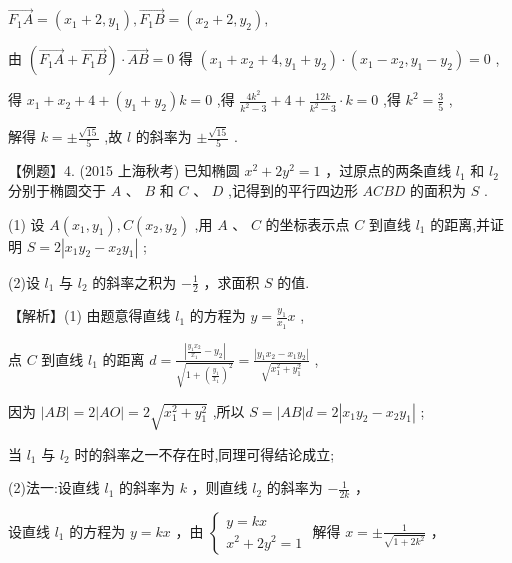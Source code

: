 \documentclass[10pt]{article}
\begin{document}
\(\overrightarrow{{F}_{1}A} = \left( {{x}_{1} + 2,{y}_{1}}\right) ,\overrightarrow{{F}_{1}B} = \left( {{x}_{2} + 2,{y}_{2}}\right) ,\)

由 \(\left( {\overrightarrow{{F}_{1}A} + \overrightarrow{{F}_{1}B}}\right)  \cdot  \overrightarrow{AB} = 0\) 得 \(\left( {{x}_{1} + {x}_{2} + 4,{y}_{1} + {y}_{2}}\right)  \cdot  \left( {{x}_{1} - {x}_{2},{y}_{1} - {y}_{2}}\right)  = 0\) ,

得 \({x}_{1} + {x}_{2} + 4 + \left( {{y}_{1} + {y}_{2}}\right) k = 0\) ,得 \(\frac{4{k}^{2}}{{k}^{2} - 3} + 4 + \frac{12k}{{k}^{2} - 3} \cdot  k = 0\) ,得 \({k}^{2} = \frac{3}{5}\) ,

解得 \(k =  \pm  \frac{\sqrt{15}}{5}\) ,故 \(l\) 的斜率为 \(\pm  \frac{\sqrt{15}}{5}\) .

【例题】4. (2015 上海秋考) 已知椭圆 \({x}^{2} + 2{y}^{2} = 1\) ，过原点的两条直线 \({l}_{1}\) 和 \({l}_{2}\) 分别于椭圆交于 \(A\) 、 \(B\) 和 \(C\text{ 、 }D\) ,记得到的平行四边形 \({ACBD}\) 的面积为 \(S\) .

(1) 设 \(A\left( {{x}_{1},{y}_{1}}\right) ,C\left( {{x}_{2},{y}_{2}}\right)\) ,用 \(A\text{ 、 }C\) 的坐标表示点 \(C\) 到直线 \({l}_{1}\) 的距离,并证明 \(S = 2\left| {{x}_{1}{y}_{2} - {x}_{2}{y}_{1}}\right|\) ;

(2)设 \({l}_{1}\) 与 \({l}_{2}\) 的斜率之积为 \(- \frac{1}{2}\) ，求面积 \(S\) 的值.

【解析】(1) 由题意得直线 \({l}_{1}\) 的方程为 \(y = \frac{{y}_{1}}{{x}_{1}}x\) ,

点 \(C\) 到直线 \({l}_{1}\) 的距离 \(d = \frac{\left| \frac{{y}_{1}{x}_{2}}{{x}_{1}} - {y}_{2}\right| }{\sqrt{1 + {\left( \frac{{y}_{1}}{{x}_{1}}\right) }^{2}}} = \frac{\left| {y}_{1}{x}_{2} - {x}_{1}{y}_{2}\right| }{\sqrt{{x}_{1}^{2} + {y}_{1}^{2}}}\) ,

因为 \(\left| {AB}\right|  = 2\left| {AO}\right|  = 2\sqrt{{x}_{1}^{2} + {y}_{1}^{2}}\) ,所以 \(S = \left| {AB}\right| d = 2\left| {{x}_{1}{y}_{2} - {x}_{2}{y}_{1}}\right|\) ;

当 \({l}_{1}\) 与 \({l}_{2}\) 时的斜率之一不存在时,同理可得结论成立;

(2)法一:设直线 \({l}_{1}\) 的斜率为 \(k\) ，则直线 \({l}_{2}\) 的斜率为 \(- \frac{1}{2k}\) ，

设直线 \({l}_{1}\) 的方程为 \(y = {kx}\) ，由 \(\left\{  {\begin{array}{l} y = {kx} \\  {x}^{2} + 2{y}^{2} = 1 \end{array}\text{ 解得 }x =  \pm  \frac{1}{\sqrt{1 + 2{k}^{2}}}}\right.\) ，
\end{document}
